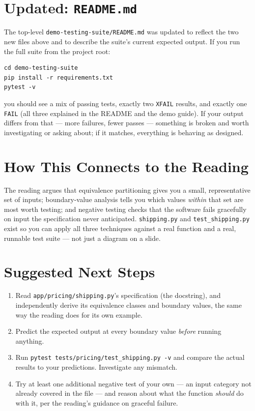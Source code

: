 \documentclass[11pt]{article}
\begin{document}
\section{Updated: \texttt{README.md}}
The top-level \texttt{demo-testing-suite/README.md} was updated to
reflect the two new files above and to describe the suite's current
expected output. If you run the full suite from the project root:

\begin{lstlisting}[style=shellstyle]
cd demo-testing-suite
pip install -r requirements.txt
pytest -v
\end{lstlisting}

you should see a mix of passing tests, exactly two \texttt{XFAIL}
results, and exactly one \texttt{FAIL} (all three explained in the
README and the demo guide). If your output differs from that --- more
failures, fewer passes --- something is broken and worth investigating
or asking about; if it matches, everything is behaving as designed.

\section{How This Connects to the Reading}
\begin{keyidea}
The reading argues that equivalence partitioning gives you a small,
representative set of inputs; boundary-value analysis tells you which
values \emph{within} that set are most worth testing; and negative
testing checks that the software fails gracefully on input the
specification never anticipated. \texttt{shipping.py} and
\texttt{test\_shipping.py} exist so you can apply all three techniques
against a real function and a real, runnable test suite --- not just a
diagram on a slide.
\end{keyidea}

\section{Suggested Next Steps}
\begin{enumerate}
\item Read \texttt{app/pricing/shipping.py}'s specification (the
docstring), and independently derive its equivalence classes and
boundary values, the same way the reading does for its own example.
\item Predict the expected output at every boundary value \emph{before}
running anything.
\item Run \texttt{pytest tests/pricing/test\_shipping.py -v} and compare
the actual results to your predictions. Investigate any mismatch.
\item Try at least one additional negative test of your own --- an input
category not already covered in the file --- and reason about what the
function \emph{should} do with it, per the reading's guidance on
graceful failure.
\end{enumerate}
\end{document}
